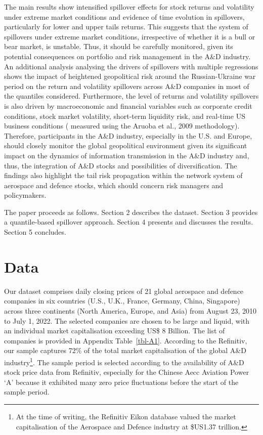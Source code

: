 \documentclass[
  letterpaper,
  DIV=11,
  numbers=noendperiod]{scrartcl}
\begin{document}
The main results show intensified spillover effects for stock returns
and volatility under extreme market conditions and evidence of time
evolution in spillovers, particularly for lower and upper tails returns.
This suggests that the system of spillovers under extreme market
conditions, irrespective of whether it is a bull or bear market, is
unstable. Thus, it should be carefully monitored, given its potential
consequences on portfolio and risk management in the A\&D industry. An
additional analysis analysing the drivers of spillovers with multiple
regressions shows the impact of heightened geopolitical risk around the
Russian-Ukraine war period on the return and volatility spillovers
across A\&D companies in most of the quantiles considered. Furthermore,
the level of returns and volatility spillovers is also driven by
macroeconomic and financial variables such as corporate credit
conditions, stock market volatility, short-term liquidity risk, and
real-time US business conditions ( measured using the Aruoba et al.,
2009 methodology). Therefore, participants in the A\&D industry,
especially in the U.S. and Europe, should closely monitor the global
geopolitical environment given its significant impact on the dynamics of
information transmission in the A\&D industry and, thus, the integration
of A\&D stocks and possibilities of diversification. The findings also
highlight the tail risk propagation within the network system of
aerospace and defence stocks, which should concern risk managers and
policymakers.

The paper proceeds as follows. Section 2 describes the dataset. Section
3 provides a quantile-based spillover approach. Section 4 presents and
discusses the results. Section 5 concludes.

\hypertarget{data}{%
\section{Data}\label{data}}

Our dataset comprises daily closing prices of 21 global aerospace and
defence companies in six countries (U.S., U.K., France, Germany, China,
Singapore) across three continents (North America, Europe, and Asia)
from August 23, 2010 to July 1, 2022. The selected companies are chosen
to be large and liquid, with an individual market capitalisation
exceeding US\$ 8 Billion. The list of companies is provided in Appendix
Table~\ref{tbl-A1}. According to the Refinitiv, our sample captures 72\%
of the total market capitalisation of the global A\&D
industry\footnote{At the time of writing, the Refinitiv Eikon database
  valued the market capitalisation of the Aerospace and Defence industry
  at \$US1.37 trillion.}. The sample period is selected according to the
availability of A\&D stock price data from Refinitiv, especially for the
Chinese Aecc Aviation Power `A' because it exhibited many zero price
fluctuations before the start of the sample period.
\end{document}
